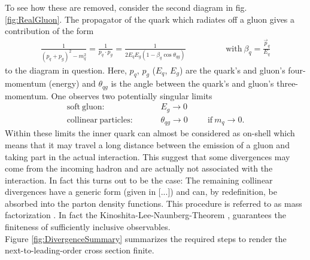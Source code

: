 To see how these are removed, consider the second diagram in fig. \ref{fig:RealGluon}. The propagator of the quark which radiates off a gluon gives a contribution of the form
\begin{align}
\frac{1}{(p_q + p_g)^2 - m_q^2} = \frac{1}{p_q \cdot p_g} = \frac{1}{2E_qE_g(1-\beta_q \cos \theta_{qg})} \hspace{2cm} \mathrm{with}\ \beta_q = \frac{\vec{p}_q}{E_q}
\end{align}
to the diagram in question. Here, $p_q$, $p_g$ ($E_q$, $E_g$) are the quark's and gluon's four-momentum (energy) and $\theta_{qg}$ is the angle between the quark's and gluon's three-momentum. One observes two potentially singular limits
\begin{align}
\mathrm{soft\ gluon:}& \hspace{1cm} E_g \to 0\\
\mathrm{collinear\ particles:}& \hspace{1cm} \theta_{qg} \to 0 \hspace{1cm} \mathrm{if}\ m_q \to 0.
\end{align}
Within these limits the inner quark can almost be considered as on-shell which means that it may travel a long distance between the emission of a gluon and taking part in the actual interaction. This suggest that some divergences may come from the incoming hadron and are actually not associated with the interaction. In fact this turns out to be the case: The remaining collinear divergences have a generic form (given in [...]) and can, by redefinition, be absorbed into the parton density functions. This procedure is referred to as mass factorization \cite{dissertori2003quantum}. In fact the Kinoshita-Lee-Naunberg-Theorem \cite{1962JMP.....3..650K},\cite{PhysRev.133.B1549} guarantees the finiteness of sufficiently inclusive observables.\\
Figure \ref{fig:DivergenceSummary} summarizes the required steps to render the next-to-leading-order cross section finite.
